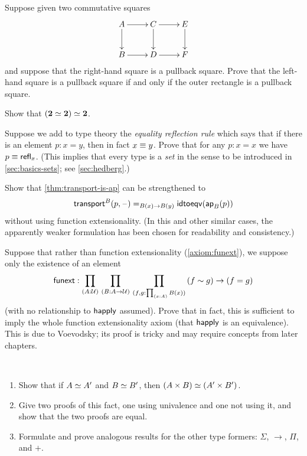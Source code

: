 \begin{ex}\label{ex:pullback-pasting}
  Suppose given two commutative squares
  \begin{equation*}
    \vcenter{\xymatrix{
        A\ar[r]\ar[d] &
        C\ar[r]\ar[d] &
        E\ar[d]\\
        B\ar[r] &
        D\ar[r] &
        F
      }}
  \end{equation*}
  and suppose that the right-hand square is a pullback square.
  Prove that the left-hand square is a pullback square if and only if the outer rectangle is a pullback square.
\end{ex}

\begin{ex}\label{ex:eqvboolbool}
  Show that $(\mathbf{2} \simeq \mathbf{2}) \simeq \mathbf{2}$.
\end{ex}

\begin{ex}\label{ex:equality-reflection}
  Suppose we add to type theory the \emph{equality reflection rule} which says that if there is an element $p:x=y$, then in fact $x\equiv y$.
  Prove that for any $p:x=x$ we have $p\equiv \mathsf{refl}_{x}$.
  (This implies that every type is a \emph{set} in the sense to be introduced in \cref{sec:basics-sets}; see \cref{sec:hedberg}.)
\end{ex}

\begin{ex}\label{ex:strengthen-transport-is-ap}
  Show that \cref{thm:transport-is-ap} can be strengthened to
  \[\mathsf{transport}^{B}(p,{\mathord{\hspace{1pt}\text{--}\hspace{1pt}}}) =_{B(x)\to B(y)} \mathsf{idtoeqv}(\mathsf{ap}_{B}(p))\]
  without using function extensionality.
  (In this and other similar cases, the apparently weaker formulation has been chosen for readability and consistency.)
\end{ex}

\begin{ex}\label{ex:strong-from-weak-funext}
  Suppose that rather than function extensionality (\cref{axiom:funext}), we suppose only the existence of an element
  \[ \funext : \prd{A:\UU}{B:A\to \UU}{f,g:\prd{x:A} B(x)} (f\htpy g) \to (f=g) \]
  (with no relationship to $\mathsf{happly}$ assumed).
  Prove that in fact, this is sufficient to imply the whole function extensionality axiom (that $\mathsf{happly}$ is an equivalence).
  This is due to Voevodsky; its proof is tricky and may require concepts from later chapters.
\end{ex}

\begin{ex}\label{ex:equiv-functor-types}\
  \begin{enumerate}
  \item Show that if $A \simeq A'$  and $B \simeq B'$, then $(A\times B) \simeq (A'\times B')$.
  \item Give two proofs of this fact, one using univalence and one not using it, and show that the two proofs are equal.
  \item Formulate and prove analogous results for the other type formers: $\Sigma$, $\to$, $\Pi$, and $+$.
\end{enumerate}
\end{ex}

